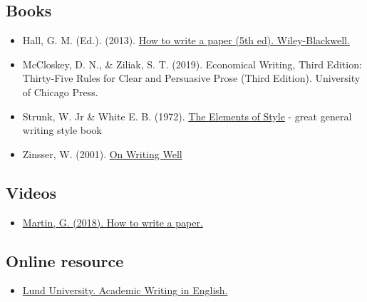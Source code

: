 \documentclass[
]{book}
\providecommand{\tightlist}{%
  \setlength{\itemsep}{0pt}\setlength{\parskip}{0pt}}
\begin{document}
\hypertarget{books}{%
\subsection{Books}\label{books}}

\begin{itemize}
\tightlist
\item
  Hall, G. M. (Ed.). (2013).
  \href{https://onlinelibrary.wiley.com/doi/book/10.1002/9781118488713}{How
  to write a paper (5th ed). Wiley-Blackwell.}
\item
  McCloskey, D. N., \& Ziliak, S. T. (2019). Economical Writing, Third
  Edition: Thirty-Five Rules for Clear and Persuasive Prose (Third
  Edition). University of Chicago Press.
\item
  Strunk, W. Jr \& White E. B. (1972).
  \href{http://www.jlakes.org/ch/web/The-elements-of-style.pdf}{The
  Elements of Style} - great general writing style book
\item
  Zinsser, W. (2001).
  \href{https://www.google.com/url?sa=t\&rct=j\&q=\&esrc=s\&source=web\&cd=\&ved=2ahUKEwiCztfjrsr0AhXvR_EDHU3aAYsQFnoECA4QAQ\&url=https\%3A\%2F\%2Fteamwork.jacobs-university.de\%2Fdownload\%2Fattachments\%2F49185212\%2Fon-writing-well.pdf\%3Fversion\%3D1\%26modificationDate\%3D1527540932000\%26api\%3Dv2\&usg=AOvVaw3eFZJabrSvWpKo5WxCAS6t}{On
  Writing Well}
\end{itemize}

\hypertarget{videos}{%
\subsection{Videos}\label{videos}}

\begin{itemize}
\tightlist
\item
  \href{https://www.youtube.com/watch?v=Vky9PDKx5KU}{Martin, G. (2018).
  How to write a paper.}
\end{itemize}

\hypertarget{online-resource}{%
\subsection{Online resource}\label{online-resource}}

\begin{itemize}
\tightlist
\item
  \href{https://www.awelu.lu.se/language/register-and-style/dos-donts/}{Lund
  University. Academic Writing in English.}
\end{itemize}
\end{document}
